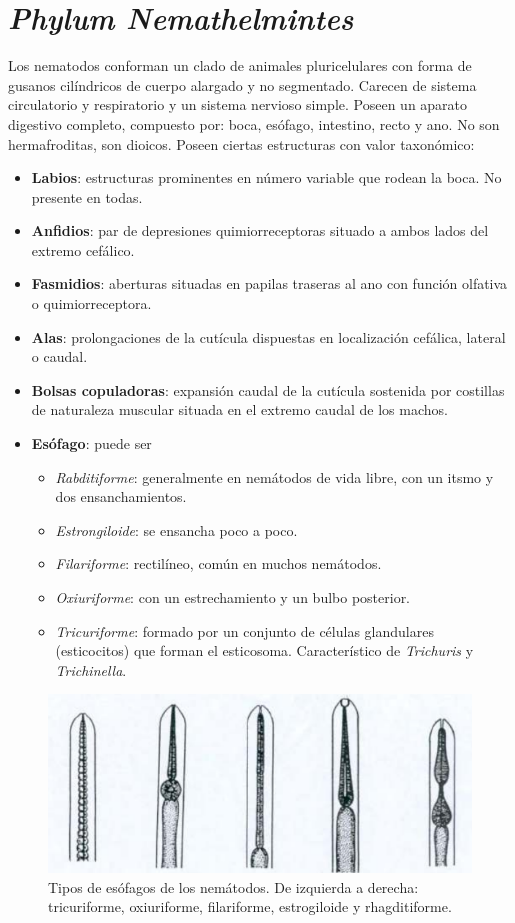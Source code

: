 \chapter{\textit{Phylum Nemathelmintes}}
Los nematodos conforman un clado de animales pluricelulares con forma de gusanos cilíndricos de cuerpo alargado y no segmentado. Carecen de sistema circulatorio y respiratorio y un sistema nervioso simple. Poseen un aparato digestivo completo, compuesto por: boca, esófago, intestino, recto y ano. No son hermafroditas, son dioicos. Poseen ciertas estructuras con valor taxonómico:
\begin{itemize}[itemsep=0pt,parsep=0pt,topsep=0pt,partopsep=0pt]
	\item \textbf{Labios}: estructuras prominentes en número variable que rodean la boca. No presente en todas.
	\item \textbf{Anfidios}: par de depresiones quimiorreceptoras situado a ambos lados del extremo cefálico.
	\item \textbf{Fasmidios}: aberturas situadas en papilas traseras al ano con función olfativa o quimiorreceptora.
	\item \textbf{Alas}: prolongaciones de la cutícula dispuestas en localización cefálica, lateral o caudal.
	\item \textbf{Bolsas copuladoras}: expansión caudal de la cutícula sostenida por costillas de naturaleza muscular situada en el extremo caudal de los machos.
	\item \textbf{Esófago}: puede ser
	\begin{itemize}[itemsep=0pt,parsep=0pt,topsep=0pt,partopsep=0pt]
		\item \textit{Rabditiforme}: generalmente en nemátodos de vida libre, con un itsmo y dos ensanchamientos.
		\item \textit{Estrongiloide}: se ensancha poco a poco.
		\item \textit{Filariforme}: rectilíneo, común en muchos nemátodos.
		\item \textit{Oxiuriforme}: con un estrechamiento y un bulbo posterior.
		\item \textit{Tricuriforme}: formado por un conjunto de células glandulares (esticocitos) que forman el esticosoma. Característico de \textit{Trichuris} y \textit{Trichinella}.
	\end{itemize}
\end{itemize}
\begin{figure}[H]
	\centering
	\includegraphics[width=0.8\columnwidth]{A.imagenes/ACV-BioSan-Parasit-NematodosMorf}
	\caption[Morfología de los esófagos de los nemátodos]{Tipos de esófagos de los nemátodos. De izquierda a derecha: tricuriforme, oxiuriforme, filariforme, estrogiloide y rhagditiforme.\label{fig:PARASIT:EsofagosMorf}}
\end{figure}
